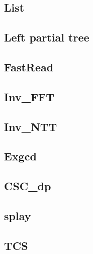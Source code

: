 \subsection{List}
\raggedbottom
\hrulefill

\subsection{Left partial tree}
\raggedbottom
\hrulefill

\subsection{FastRead}
\raggedbottom
\hrulefill

\subsection{Inv\_FFT}
\raggedbottom
\hrulefill

\subsection{Inv\_NTT}
\raggedbottom
\hrulefill

\subsection{Exgcd}
\raggedbottom
\hrulefill

\subsection{CSC\_dp}
\raggedbottom
\hrulefill

\subsection{splay}
\raggedbottom
\hrulefill

\subsection{TCS}
\raggedbottom
\hrulefill

